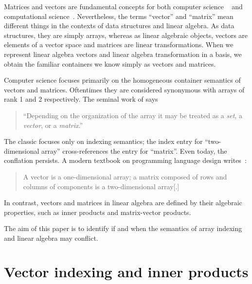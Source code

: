 Matrices and vectors are fundamental concepts for both computer science
~\cite{Knuth1967,Pratt2001} and computational
science~\cite{Strang2003,Trefethen1997}. Nevertheless, the terms ``vector'' and
``matrix'' mean different things in the contexts of data structures and linear
algebra. As data structures, they are simply arrays, whereas as linear
algebraic objects, vectors are elements of a vector space and matrices are linear transformations.
When we represent linear algebra vectors and linear algebra transformation in a basis,
we obtain the familiar containers we know simply as vectors and matrices.



Computer science focuses primarily on the homogeneous container semantics of
vectors and matrices. Oftentimes they are considered synonymous with arrays of
rank 1 and 2 respectively. The seminal work of \cite{Iliffe1961} says
%
\begin{quote}
``Depending on the organization of the array it may
be treated as a \textit{set}, a \textit{vector}, or a \textit{matrix}.''
\end{quote}
%
The classic \cite{Knuth1967} focuses only on indexing semantics; the index
entry for ``two-dimensional array'' cross-references the entry for ``matrix''.
Even today, the conflation persists. A modern textbook on programming language
design writes~\cite[p. 215]{Pratt2001}:
%
\begin{quote}
A vector is a one-dimensional array; a matrix composed of rows and columns of
components is a two-dimensional array[.]
\end{quote}


In contrast, vectors and matrices in linear algebra are defined by their
algebraic properties, such as inner products and matrix-vector products.

The aim of this paper is to identify if and when the semantics of array
indexing and linear algebra may conflict.



\section{Vector indexing and inner products}

